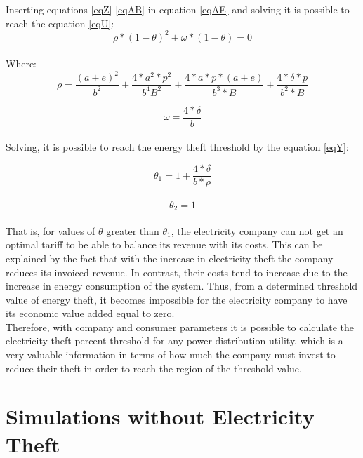 \documentclass[preprint,12pt]{elsarticle}
\begin{document}
Inserting equations \ref{eqZ}-\ref{eqAB} in equation \ref{eqAE} and solving it is possible to reach the equation \ref{eqU}:\\
\begin{equation}
\rho*(1-\theta)^2+ \omega*(1-\theta) = 0
\label{eqU}
\end{equation}\\

Where:\\
\begin{equation}
\rho= \frac{(a+e)^2}{b^2}+\frac{4*a^2 * p^2}{b^4 B^2} + \frac{4*a*p*(a+e)}{b^3 * B}+ \frac{4*\delta*p}{b^2*B}
\label{eqV}
\end{equation}

\begin{equation}
\omega = \frac{4*\delta}{b}
\label{eqX}
\end{equation}\\
Solving, it is possible to reach the energy theft threshold by the equation \ref{eqY}:

\begin{equation}
\theta_1 = 1 + \frac{4* \delta}{b * \rho}
\label{eqY}
\end{equation}\\

\begin{equation}
\theta_2 = 1
\end{equation}\\

That is, for values of $\theta$ greater than $\theta_1$, the electricity company can not get an optimal tariff to be able to balance its revenue with its costs. This can be explained by the fact that with the increase in electricity theft the company reduces its invoiced revenue. In contrast, their costs tend to increase due to the increase in energy consumption of the system. Thus, from a determined threshold value of energy theft, it becomes impossible for the electricity company to have its economic value added equal to zero.\\
Therefore, with company and consumer parameters it is possible to calculate the electricity theft percent threshold for any power distribution utility, which is a very valuable information in terms of how much the company must invest to reduce their theft in order to reach the region of the threshold value.\\

\section{Simulations without Electricity Theft}
\label{S:3}
\end{document}
